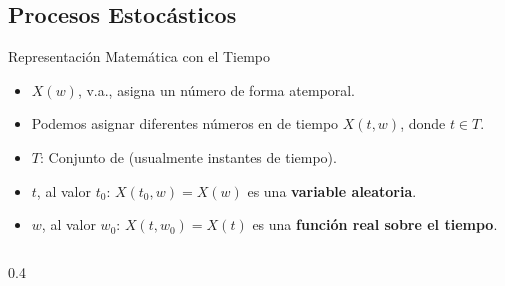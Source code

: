 \documentclass[10pt, envcountsect, handout, aspectratio=1610, hyperref={hypertexnames=true}]{beamer}
\begin{document}
   
   



\subsection{Procesos Estocásticos}



\begin{frame}{Representación Matemática con el Tiempo}
\begin{itemize}
	\item $X(w)$, v.a.,  asigna un número de forma atemporal.
    \item Podemos asignar diferentes números en  de tiempo $X(t, w)$, donde $t \in T$.
    \item $T$: Conjunto de  (usualmente instantes de tiempo).
    \item {} $t$, al valor $t_0$: $X(t_0,w)=X(w)$ es una \textbf{variable aleatoria}.
    \item {} $w$, al valor $w_0$: $X(t, w_0)=X(t)$ es una \textbf{función real sobre el tiempo}.
\end{itemize}


    \begin{columns}
        \begin{column}{0.4\textwidth}
\end{column}
\end{columns}
\end{frame}
\end{document}
